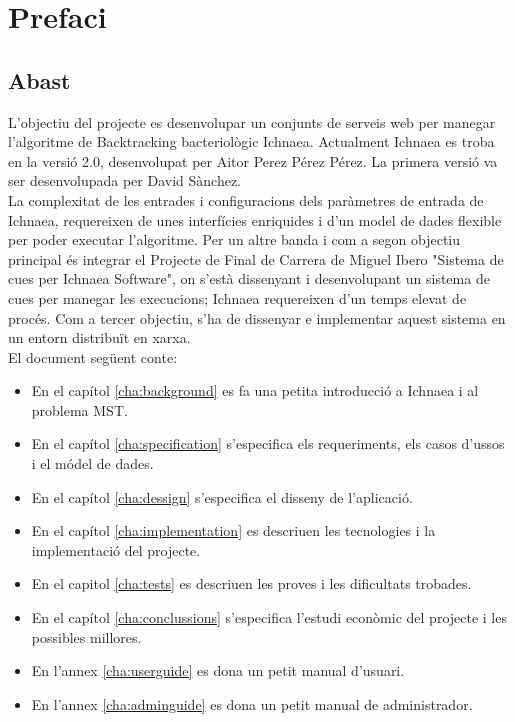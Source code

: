 \chapter{Prefaci}
\label{cha:prefaci}


\section{Abast}
\label{sec:abast}

L'objectiu del projecte es desenvolupar un conjunts de serveis web per manegar l'algoritme de Backtracking bacteriol\`{o}gic Ichnaea. Actualment Ichnaea es troba en la versi\'{o} 2.0, desenvolupat per Aitor Perez P\'{e}rez P\'{e}rez. La primera versi\'{o} va ser desenvolupada per David Sànchez. \\

La complexitat de les entrades i configuracions dels paràmetres de entrada de Ichnaea, requereixen de unes interfícies enriquides i d'un model de dades flexible per poder executar l'algoritme. Per un altre banda i com a segon objectiu principal \'{e}s integrar el Projecte de Final de Carrera de Miguel Ibero "Sistema de cues per Ichnaea Software", on s'est\`{a} dissenyant i desenvolupant un sistema de cues per manegar les execucions; Ichnaea requereixen d'un temps elevat de proc\'{e}s. Com a tercer objectiu, s'ha de dissenyar e implementar aquest sistema en un entorn distribuït en xarxa. \\

El document següent conte:
\begin{itemize}
\item En el cap\'{i}tol \ref{cha:background} es fa una petita introducci\'{o} a Ichnaea i al problema MST. 
\item En el cap\'{i}tol \ref{cha:specification} s'especifica els requeriments, els casos d'ussos i el m\'{o}del de dades.
\item En el cap\'{i}tol \ref{cha:dessign} s'especifica el disseny de l'aplicació.
\item En el capítol \ref{cha:implementation} es descriuen les tecnologies i la implementació del projecte.
\item En el capitol \ref{cha:tests} es descriuen les proves i les dificultats trobades.
\item En el cap\'{i}tol \ref{cha:conclussions} s'especifica l'estudi econòmic del projecte i les possibles millores.
\item En l'annex \ref{cha:userguide} es dona un petit manual d'usuari.
\item En l'annex \ref{cha:adminguide} es dona un petit manual de administrador.
\end{itemize}

